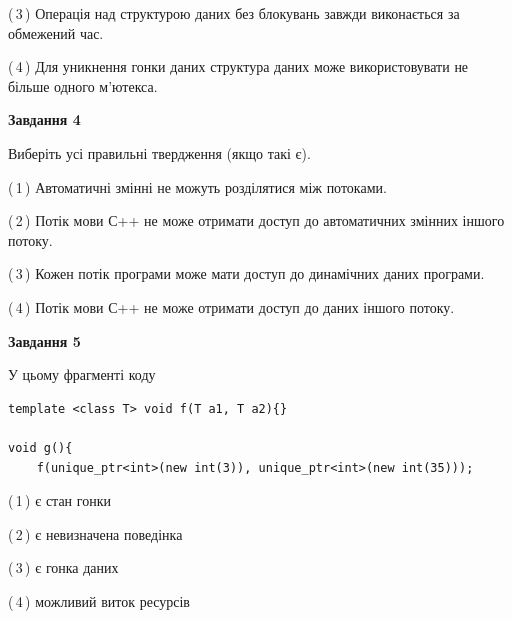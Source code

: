\documentclass[12pt, ukrainian]{article}
\begin{document}
\begin {large}
{(\,3\,) Операція над структурою даних без блокувань завжди виконається за обмежений час.%

(\,4\,) Для уникнення гонки даних структура даних може використовувати не більше одного м’ютекса.%



\begin{center}
\textbf{Завдання 4}
\end{center}
Виберіть усі правильні твердження (якщо такі є).\par
\vspace{2mm}

(\,1\,) Автоматичні змінні не можуть розділятися між потоками.%

(\,2\,) Потік мови С++ не може отримати доступ до автоматичних змінних іншого потоку.%

(\,3\,) Кожен потік програми може мати доступ до динамічних даних програми.%

(\,4\,) Потік мови С++ не може отримати доступ до даних іншого потоку.%



\begin{center}
\textbf{Завдання 5}
\end{center}
У цьому фрагменті коду
\begin{verbatim}
template <class T> void f(T a1, T a2){}

void g(){
    f(unique_ptr<int>(new int(3)), unique_ptr<int>(new int(35)));
\end{verbatim}

(\,1\,) є стан гонки%

(\,2\,) є невизначена поведінка%

(\,3\,) є гонка даних%

(\,4\,) можливий виток ресурсів%


}
\end {large}
\end{document}
